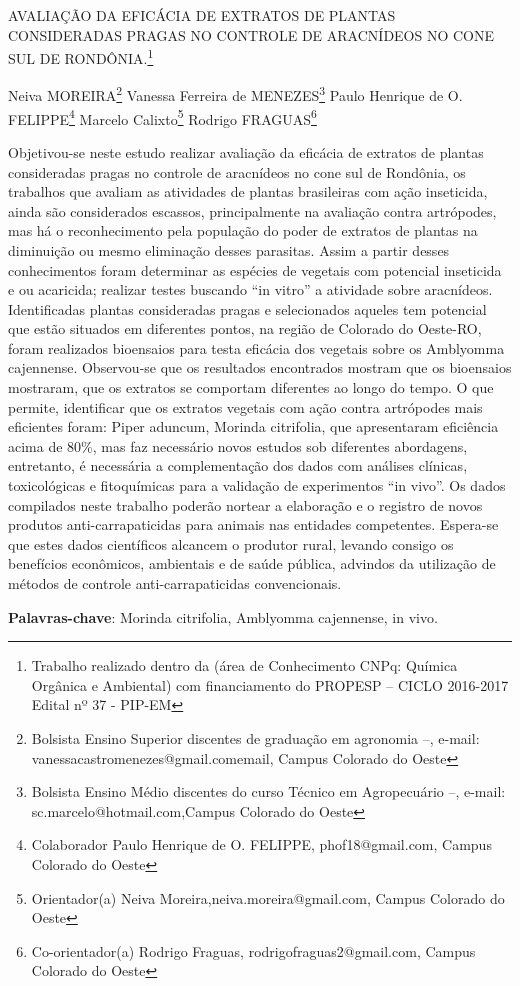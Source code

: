\documentclass[article,12pt,onesidea,4paper,english,brazil]{abntex2}
\begin{document}
	
	
	\frenchspacing 
	
	\begin{center}
		\LARGE AVALIAÇÃO DA EFICÁCIA DE EXTRATOS DE PLANTAS CONSIDERADAS
		PRAGAS NO CONTROLE DE ARACNÍDEOS NO CONE SUL DE RONDÔNIA.\footnote{Trabalho realizado dentro da (área de Conhecimento CNPq: Química Orgânica e Ambiental) com
			financiamento do PROPESP – CICLO 2016-2017 Edital nº 37 - PIP-EM}
		
		\normalsize
	Neiva MOREIRA\footnote{Bolsista Ensino Superior discentes de graduação em agronomia –, e-mail:
		vanessacastromenezes@gmail.comemail, Campus Colorado do Oeste} 
		Vanessa Ferreira de MENEZES\footnote{Bolsista Ensino Médio discentes do curso Técnico em Agropecuário –, e-mail:
			sc.marcelo@hotmail.com,Campus Colorado do Oeste} 
		Paulo Henrique de O. FELIPPE\footnote{Colaborador Paulo Henrique de O. FELIPPE, phof18@gmail.com, Campus Colorado do Oeste} 
	Marcelo
	Calixto\footnote{Orientador(a) Neiva Moreira,neiva.moreira@gmail.com, Campus Colorado do Oeste}
		Rodrigo FRAGUAS\footnote{Co-orientador(a) Rodrigo Fraguas, rodrigofraguas2@gmail.com, Campus Colorado do Oeste} 
	\end{center}
	
	\noindent Objetivou-se neste estudo realizar avaliação da eficácia de extratos de
	plantas consideradas pragas no controle de aracnídeos no cone sul de Rondônia, os
	trabalhos que avaliam as atividades de plantas brasileiras com ação inseticida, ainda
	são considerados escassos, principalmente na avaliação contra artrópodes, mas há
	o reconhecimento pela população do poder de extratos de plantas na diminuição ou
	mesmo eliminação desses parasitas. Assim a partir desses conhecimentos foram
	determinar as espécies de vegetais com potencial inseticida e ou acaricida; realizar
	testes buscando “in vitro” a atividade sobre aracnídeos. Identificadas plantas
	consideradas pragas e selecionados aqueles tem potencial que estão situados em
	diferentes pontos, na região de Colorado do Oeste-RO, foram realizados bioensaios
	para testa eficácia dos vegetais sobre os Amblyomma cajennense. Observou-se que
	os resultados encontrados mostram que os bioensaios mostraram, que os extratos
	se comportam diferentes ao longo do tempo. O que permite, identificar que os
	extratos vegetais com ação contra artrópodes mais eficientes foram: Piper aduncum,
	Morinda citrifolia, que apresentaram eficiência acima de 80\%, mas faz necessário
	novos estudos sob diferentes abordagens, entretanto, é necessária a
	complementação dos dados com análises clínicas, toxicológicas e fitoquímicas para
	a validação de experimentos “in vivo”. Os dados compilados neste trabalho poderão
	nortear a elaboração e o registro de novos produtos anti-carrapaticidas para animais
	nas entidades competentes. Espera-se que estes dados científicos alcancem o
	produtor rural, levando consigo os benefícios econômicos, ambientais e de saúde
	pública, advindos da utilização de métodos de controle anti-carrapaticidas
	convencionais.
	
	\vspace{\onelineskip}
	
	\noindent
	\textbf{Palavras-chave}: Morinda citrifolia, Amblyomma cajennense, in vivo.
	
\end{document}

